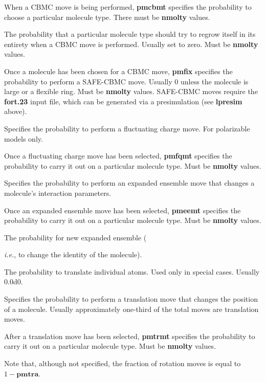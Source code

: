\documentclass[12pt,letterpaper]{article}
\begin{document}
{{ When a CBMC move is being performed, 
{\textbf{pmcbmt}} specifies the probability to choose a particular molecule type.  
There must be {\textbf{nmolty}} values.

 The probability that a particular molecule type
should try to regrow itself in its entirety when a CBMC move is
performed.  Usually set to zero.  Must be {\textbf{nmolty}} values.

 Once a molecule has been chosen for a CBMC move,
{\textbf{pmfix}} specifies the probability to perform a SAFE-CBMC
move.  Usually 0 unless the molecule is large or a flexible ring.  
Must be {\textbf{nmolty}} values.
SAFE-CBMC moves require the {\textbf{fort.23}} input file, which can be generated via a
presimulation (see {\textbf{lpresim}} above).

 Specifies the probability to perform a
fluctuating charge move.  For polarizable models only.

 Once a fluctuating charge move has been selected, 
{\textbf{pmfqmt}} specifies the probability to carry it out on a
particular molecule type.  Must be {\textbf{nmolty}} values.

 Specifies the probability to perform an
expanded ensemble move that changes a molecule's interaction
parameters.

 Once an expanded ensemble move has been selected, 
{\textbf{pmeemt}} specifies the probability to carry it out on a
particular molecule type.  Must be {\textbf{nmolty}} values.

 The probability for new expanded ensemble 
({\textit{i.e.}, to change the identity of the molecule).

 The probability to translate individual atoms.
Used only in special cases. Usually 0.0d0.

 Specifies the probability to perform a
translation move that changes the position of a molecule.  
Usually approximately one-third of the total moves are translation
moves.

 After a translation move has been selected,
{\textbf{pmtrmt}} specifies the probability to carry it out on a particular molecule
type.  Must be {\textbf{nmolty}} values.

\noindent Note that, although not specified, the fraction of rotation moves is equal to 
$1 - {\textbf{pmtra}}$.

}}}
\end{document}
